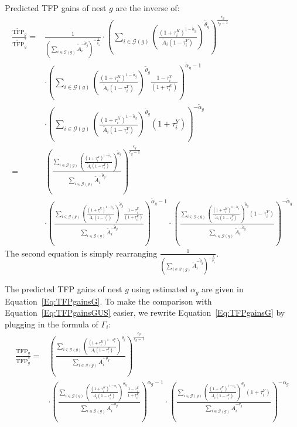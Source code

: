 \documentclass[12pt]{article}
\begin{document}
Predicted TFP gains of nest $g$ are the inverse of:
\begin{align}
\frac{\widetilde{\text{TFP}}_g}{\widetilde{\text{TFP}}_g^*}=&\frac{1}{\left(\sum_{i \in \mathcal{G}(g)} \tilde{A}_i^{-\tilde{\theta}_g} \right)^{-\frac{1}{\tilde{\theta}_g}}}
\cdot \left( \sum_{i\in\mathcal{G}(g)}\left( \frac{(1+\tau_i^K)^{1-\tilde{\alpha}_g}}{\tilde{A}_i(1-\tau_i^Y)} \right)^{\tilde{\theta}_g} \right)^{\frac{\epsilon_g}{\epsilon_g-1}} \nonumber\\
& \cdot \left( \sum_{i\in\mathcal{G}(g)}\left( \frac{(1+\tau_i^K)^{1-\tilde{\alpha}_g}}{\tilde{A}_i(1-\tau_i^Y)} \right)^{\tilde{\theta}_g} \frac{1-\tau_i^Y}{(1+\tau_i^K)}\right)^{\tilde{\alpha}_g-1} \nonumber\\
& \cdot \left( \sum_{i\in\mathcal{G}(g)}\left( \frac{(1+\tau_i^K)^{1-\tilde{\alpha}_g}}{\tilde{A}_i(1-\tau_i^Y)} \right)^{\tilde{\theta}_g} (1+\tau_i^Y)\right)^{-\tilde{\alpha}_g} \nonumber\\
=& \left( \frac{\sum_{i\in\mathcal{G}(g)}\left( \frac{(1+\tau_i^K)^{1-\tilde{\alpha}_g}}{\tilde{A}_i(1-\tau_i^Y)} \right)^{\tilde{\theta}_g}}{\sum_{i \in \mathcal{G}(g)} \tilde{A}_i^{-\tilde{\theta}_g}} \right)^{\frac{\epsilon_g}{\epsilon_g-1}} \label{Eq:TFPgainsGUS}\\
& \cdot \left( \frac{\sum_{i\in\mathcal{G}(g)}\left( \frac{(1+\tau_i^K)^{1-\tilde{\alpha}_g}}{\tilde{A}_i(1-\tau_i^Y)} \right)^{\tilde{\theta}_g} \frac{1-\tau_i^Y}{(1+\tau_i^K)}}{\sum_{i \in \mathcal{G}(g)} \tilde{A}_i^{-\tilde{\theta}_g}}\right)^{\tilde{\alpha}_g-1} \nonumber \cdot \left(\frac{ \sum_{i\in\mathcal{G}(g)}\left( \frac{(1+\tau_i^K)^{1-\tilde{\alpha}_g}}{\tilde{A}_i(1-\tau_i^Y)} \right)^{\tilde{\theta}_g} (1-\tau_i^Y)}{\sum_{i \in \mathcal{G}(g)} \tilde{A}_i^{-\tilde{\theta}_g}}\right)^{-\tilde{\alpha}_g} \nonumber
\end{align}
The second equation is simply rearranging $\frac{1}{\left(\sum_{i \in \mathcal{G}(g)} \tilde{A}_i^{-\tilde{\theta}_g} \right)^{-\frac{1}{\tilde{\theta}_g}}}$. 

The predicted TFP gains of nest $g$ using estimated $\alpha_g$ are given in Equation~\eqref{Eq:TFPgainsG}. To make the comparison with Equation~\eqref{Eq:TFPgainsGUS} easier, we rewrite Equation~\eqref{Eq:TFPgainsG} by plugging in the formula of $\Gamma_i$:
\begin{align}
\frac{\text{TFP}_g}{\text{TFP}_g^*}=& \left( \frac{\sum_{i\in\mathcal{G}(g)}\left( \frac{(1+\tau_i^K)^{1-\alpha_g^K}}{A_i(1-\tau_i^Y)} \right)^{\theta_g}}{\sum_{i \in \mathcal{G}(g)} A_i^{-\theta_g}} \right)^{\frac{\epsilon_g}{\epsilon_g-1}} \label{Eq:TFPgainsG2}\\
& \cdot \left( \frac{\sum_{i\in\mathcal{G}(g)}\left( \frac{(1+\tau_i^K)^{1-\alpha_g}}{A_i(1-\tau_i^Y)} \right)^{\theta_g} \frac{1-\tau_i^Y}{1+\tau_i^K}}{\sum_{i \in \mathcal{G}(g)} A_i^{-\theta_g}} \right)^{\alpha_g-1} \cdot \left( \frac{\sum_{i\in\mathcal{G}(g)}\left( \frac{(1+\tau_i^K)^{1-\alpha_g}}{A_i(1-\tau_i^Y)} \right)^{\theta_g} (1+\tau_i^Y)}{\sum_{i \in \mathcal{G}(g)} A_i^{-\theta_g}}\right)^{-\alpha_g} \nonumber
\end{align}
\end{document}
